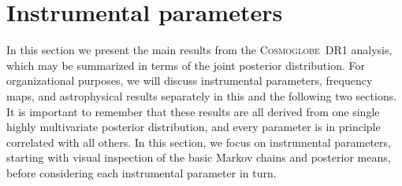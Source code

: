 \documentclass[twocolumn]{../../common/aa}
\def\WMAP{\emph{WMAP}}
\newcommand{\BP}{\textsc{BeyondPlanck}}
\newcommand{\cosmoglobe}{\textsc{Cosmoglobe}}
\begin{document}












\section{Instrumental parameters}
\label{sec:instrument}

In this section we present the main results from the \cosmoglobe\ DR1 analysis, which may be summarized in terms of the joint posterior distribution. For organizational purposes, we will discuss instrumental parameters, frequency maps, and astrophysical results separately in this and the following two sections. It is important to remember that these results are all derived from one single highly multivariate posterior distribution, and every parameter is in principle correlated with all others. In this section, we focus on instrumental parameters, starting with visual inspection of the basic Markov chains and posterior means, before considering each instrumental parameter in turn.
\end{document}
